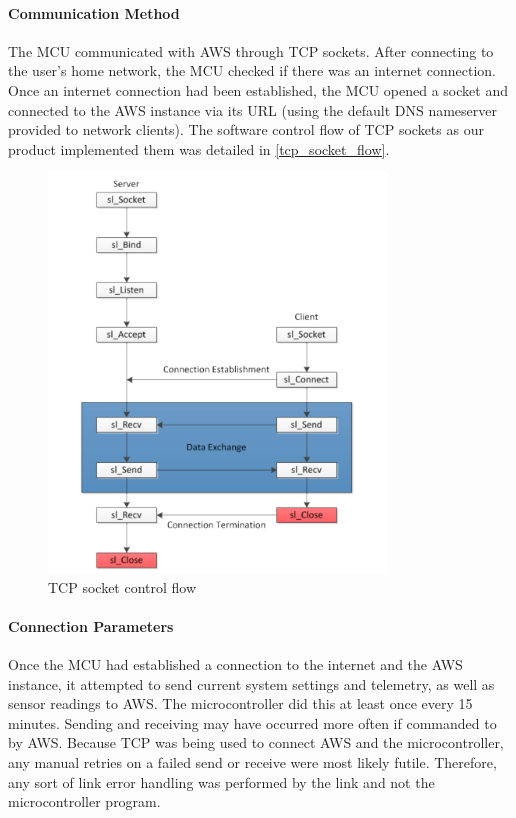 \paragraph{Communication Method}
The MCU communicated with AWS through TCP sockets. After connecting to the user's home network, the MCU checked if there was an internet connection. Once an internet connection had been established, the MCU opened a socket and connected to the AWS instance via its URL (using the default DNS nameserver provided to network clients). The software control flow of TCP sockets as our product implemented them was detailed in \autoref{tcp_socket_flow}.
\begin{figure}[H]
    \caption{TCP socket control flow \cite{swru368c}}
    \label{tcp_socket_flow}
    \centering
    \includegraphics[width=0.8\textwidth]{images/tcp_socket_flow.png}
\end{figure}

\paragraph{Connection Parameters}
Once the MCU had established a connection to the internet and the AWS
instance, it attempted to send current system settings and telemetry, as
well as sensor readings to AWS. The microcontroller did this at least
once every 15 minutes. Sending and receiving may have occurred more often if
commanded to by AWS. Because TCP was being used to connect AWS and the
microcontroller, any manual retries on a failed send or receive were most
likely futile. Therefore, any sort of link error handling was performed by 
the link and not the microcontroller program.

